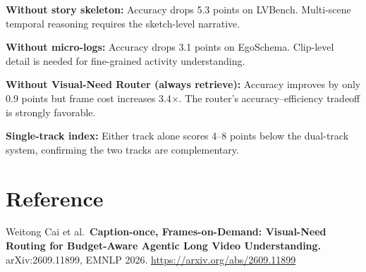 \documentclass[10pt,twocolumn]{article}
\begin{document}
\textbf{Without story skeleton:} Accuracy drops 5.3 points on LVBench.
Multi-scene temporal reasoning requires the sketch-level narrative.

\textbf{Without micro-logs:} Accuracy drops 3.1 points on EgoSchema.
Clip-level detail is needed for fine-grained activity understanding.

\textbf{Without Visual-Need Router (always retrieve):} Accuracy
improves by only 0.9 points but frame cost increases 3.4$\times$.
The router's accuracy--efficiency tradeoff is strongly favorable.

\textbf{Single-track index:} Either track alone scores 4--8 points
below the dual-track system, confirming the two tracks are complementary.

\section*{Reference}

Weitong Cai et al.\ \textbf{Caption-once, Frames-on-Demand: Visual-Need
Routing for Budget-Aware Agentic Long Video Understanding.}
arXiv:2609.11899, EMNLP 2026.
\url{https://arxiv.org/abs/2609.11899}
\end{document}
